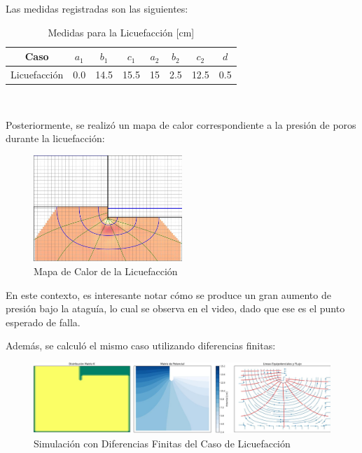 Las medidas registradas son las siguientes:

\begin{table}[H]
    \centering
    \caption{Medidas para la Licuefacción [cm]}
    \begin{tabular}{|c|c|c|c|c|c|c|c|}
    \hline
    Caso & $a_1$ & $b_1$ & $c_1$ & $a_2$ & $b_2$ & $c_2$ & $d$ \\ \hline
    Licuefacción & 0.0 & 14.5 & 15.5 & 15 & 2.5 & 12.5 & 0.5 \\ \hline
    \end{tabular}\\
    \label{tab:medidas1}
\end{table}

Posteriormente, se realizó un mapa de calor correspondiente a la presión de poros durante la licuefacción:

\begin{figure}[H]
    \centering
    \includegraphics[width=0.5\textwidth]{GRAFICOS/caso_licuefaccion_presion_poros.jpg}
    \caption{Mapa de Calor de la Licuefacción}
    \label{fig:maqueta_licuefaccion}
\end{figure}

En este contexto, es interesante notar cómo se produce un gran aumento de presión bajo la ataguía, lo cual se observa en el video, dado que ese es el punto esperado de falla.

Además, se calculó el mismo caso utilizando diferencias finitas:

\begin{figure}[H]
    \centering
    \includegraphics[width=1\textwidth]{GRAFICOS/laplace_caso_licuefaccion_escala_cm.jpg}
    \caption{Simulación con Diferencias Finitas del Caso de Licuefacción}
    \label{fig:maqueta_licuefaccion_diferencias_finitas}
\end{figure}


